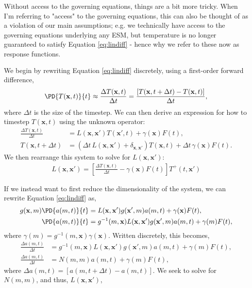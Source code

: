 Without access to the governing equations, things are a bit more tricky. When I'm referring to "access" to the governing equations, this can also be thought of as a violation of our main assumptions; e.g. we technically have access to the governing equations underlying any ESM, but temperature is no longer guaranteed to satisfy Equation \ref{eq:lindiff} - hence why we refer to these now as response functions.

We begin by rewriting Equation \ref{eq:lindiff} discretely, using a first-order forward difference,
\begin{align}
  \PD{T(\mathbf{x},t)}{t} \approx \frac{\Delta T(\mathbf{x},t)}{\Delta t} = \frac{[T(\mathbf{x},t + \Delta t) - T(\mathbf{x},t)]}{\Delta t},
\end{align}
where $\Delta t$ is the size of the timestep. We can then derive an expression for how to timestep $T(\mathbf{x},t)$ using the unknown operator:
\begin{align}
  \frac{\Delta T(\mathbf{x},t)}{\Delta t} &= L(\mathbf{x},\mathbf{x}')T(\mathbf{x}',t) + \gamma(\mathbf{x})F(t),\\
  T(\mathbf{x},t+\Delta t) &= \left(\Delta t \, L(\mathbf{x},\mathbf{x}') + \delta_{\mathbf{x},\mathbf{x}'}\right) T(\mathbf{x},t) + \Delta t \, \gamma(\mathbf{x})F(t)\label{eq:timestep}.
\end{align}
We then rearrange this system to solve for $L(\mathbf{x},\mathbf{x}')$:
\begin{align}
  L(\mathbf{x},\mathbf{x}') = \left[\frac{\Delta T(\mathbf{x},t)}{\Delta t} - \gamma(\mathbf{x})F(t)\right]T^+(t, \mathbf{x}')
\end{align}

If we instead want to first reduce the dimensionality of the system, we can rewrite Equation \ref{eq:lindiff} as,
\begin{align}
  g(\mathbf{x},m)\PD{a(m,t)}{t} &= L(\mathbf{x},\mathbf{x}')g(\mathbf{x}',m)a(m,t) + \gamma(\mathbf{x})F(t),\\
  \PD{a(m,t)}{t} &= g^{-1}(m,\mathbf{x})L(\mathbf{x},\mathbf{x}')g(\mathbf{x}',m)a(m,t) +\gamma(m)F(t),
\end{align}
where $\gamma(m) = g^{-1}(m,\mathbf{x})\gamma(\mathbf{x})$. Written discretely, this becomes,
\begin{align}
  \frac{\Delta a(m,t)}{\Delta t} &= g^{-1}(m,\mathbf{x})L(\mathbf{x},\mathbf{x}')g(\mathbf{x}',m)a(m,t) + \gamma(m)F(t),\\
  \frac{\Delta a(m,t)}{\Delta t}  &= N(m,m)a(m,t) + \gamma(m)F(t),
\end{align}
where $\Delta a(m,t)  = [a(m,t + \Delta t) - a(m,t)]$. We seek to solve for $N(m,m)$, and thus, $L(\mathbf{x},\mathbf{x}')$,

